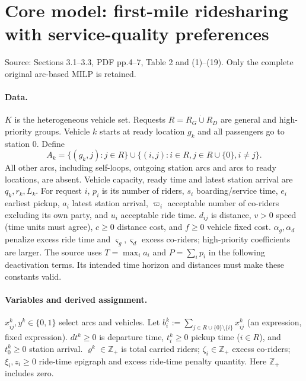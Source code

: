 \documentclass[11pt]{article}
\begin{document}
\section*{Core model: first-mile ridesharing with service-quality preferences}
Source: Sections 3.1--3.3, PDF pp.4--7, Table 2 and (1)--(19).
Only the complete original arc-based MILP is retained.
\paragraph{Data.}
$K$ is the heterogeneous vehicle set. Requests $R=R_G\mathbin{\dot\cup}R_D$
are general and high-priority groups. Vehicle $k$ starts at ready location
$g_k$ and all passengers go to station $0$. Define
\[
 A_k=\{(g_k,j):j\in R\}\cup
 \{(i,j):i\in R,j\in R\cup\{0\},i\ne j\}.
\]
All other arcs, including self-loops, outgoing station arcs and arcs to
ready locations, are absent. Vehicle capacity, ready time and latest
station arrival are $q_k,r_k,L_k$. For request $i$, $p_i$ is its number
of riders, $s_i$ boarding/service time, $e_i$ earliest pickup,
$a_i$ latest station arrival, $\varpi_i$ acceptable number of co-riders
excluding its own party, and $u_i$ acceptable ride time.
$d_{ij}$ is distance, $v>0$ speed (time units must agree), $c\ge0$
distance cost, and $f\ge0$ vehicle fixed cost.
$\alpha_g,\alpha_d$ penalize excess ride time and
$\varsigma_g,\varsigma_d$ excess co-riders; high-priority coefficients
are larger. The source uses $T=\max_i a_i$ and $P=\sum_i p_i$ in the
following deactivation terms. Its intended time horizon and distances
must make these constants valid.
\paragraph{Variables and derived assignment.}
$x^k_{ij},y^k\in\{0,1\}$ select arcs and vehicles. Let
$b_i^k:=\sum_{j\in R\cup\{0\}\setminus\{i\}}x^k_{ij}$ (an expression,
fixed expression). $dt^k\ge0$ is departure time,
$t_i^k\ge0$ pickup time ($i\in R$), and $t_0^k\ge0$ station arrival.
$\varrho^k\in\mathbb Z_+$ is total carried riders;
$\zeta_i\in\mathbb Z_+$ excess co-riders;
$\xi_i,z_i\ge0$ ride-time epigraph and excess ride-time penalty quantity.
Here $\mathbb Z_+$ includes zero.
\end{document}
